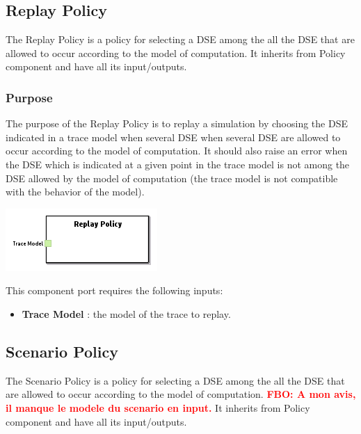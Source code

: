 \documentclass{gemoc} %
\begin{document}
\subsection{Replay Policy}
The Replay Policy is a policy for selecting a DSE among the all the DSE that are allowed to occur according to the model of computation.
It inherits from Policy component and have all its input/outputs.

\subsubsection{Purpose}
The purpose of the Replay Policy is to replay a simulation by choosing the DSE indicated in a trace model when several DSE when several DSE are allowed to occur according to the model of computation. It should also raise an error when the DSE which is indicated at a given point in the trace model is not among the DSE allowed by the model of computation (the trace model is not compatible with the behavior of the model).

\begin{center}
\includegraphics*[trim=0.0cm 0.0cm 0cm 0.0cm, clip=true]{../images/generated/Generated_Replay_Policy.png}
\end{center}

This component port requires the following inputs:
\begin{itemize}
  \item \textbf{Trace Model} :
the model of the trace to replay.
\end{itemize}



\subsection{Scenario Policy}
The Scenario Policy is a policy for selecting a DSE among the all the DSE that are allowed to occur according to the model of computation.
\textcolor{red}{\textbf{FBO: A mon avis, il manque le modele du scenario en input.}}
It inherits from Policy component and have all its input/outputs.
\end{document}
